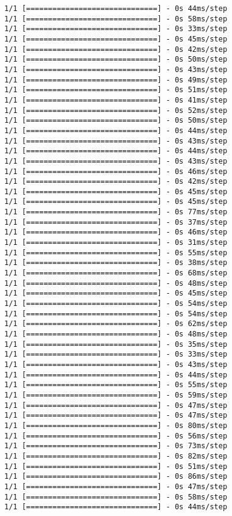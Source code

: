 \documentclass[11pt]{article}
\begin{document}
\begin{Verbatim}[commandchars=\\\{\}]
1/1 [==============================] - 0s 44ms/step
1/1 [==============================] - 0s 58ms/step
1/1 [==============================] - 0s 33ms/step
1/1 [==============================] - 0s 45ms/step
1/1 [==============================] - 0s 42ms/step
1/1 [==============================] - 0s 50ms/step
1/1 [==============================] - 0s 43ms/step
1/1 [==============================] - 0s 49ms/step
1/1 [==============================] - 0s 51ms/step
1/1 [==============================] - 0s 41ms/step
1/1 [==============================] - 0s 52ms/step
1/1 [==============================] - 0s 50ms/step
1/1 [==============================] - 0s 44ms/step
1/1 [==============================] - 0s 43ms/step
1/1 [==============================] - 0s 44ms/step
1/1 [==============================] - 0s 43ms/step
1/1 [==============================] - 0s 46ms/step
1/1 [==============================] - 0s 42ms/step
1/1 [==============================] - 0s 45ms/step
1/1 [==============================] - 0s 45ms/step
1/1 [==============================] - 0s 77ms/step
1/1 [==============================] - 0s 37ms/step
1/1 [==============================] - 0s 46ms/step
1/1 [==============================] - 0s 31ms/step
1/1 [==============================] - 0s 55ms/step
1/1 [==============================] - 0s 38ms/step
1/1 [==============================] - 0s 68ms/step
1/1 [==============================] - 0s 48ms/step
1/1 [==============================] - 0s 45ms/step
1/1 [==============================] - 0s 54ms/step
1/1 [==============================] - 0s 54ms/step
1/1 [==============================] - 0s 62ms/step
1/1 [==============================] - 0s 48ms/step
1/1 [==============================] - 0s 35ms/step
1/1 [==============================] - 0s 33ms/step
1/1 [==============================] - 0s 43ms/step
1/1 [==============================] - 0s 44ms/step
1/1 [==============================] - 0s 55ms/step
1/1 [==============================] - 0s 59ms/step
1/1 [==============================] - 0s 47ms/step
1/1 [==============================] - 0s 47ms/step
1/1 [==============================] - 0s 80ms/step
1/1 [==============================] - 0s 56ms/step
1/1 [==============================] - 0s 73ms/step
1/1 [==============================] - 0s 82ms/step
1/1 [==============================] - 0s 51ms/step
1/1 [==============================] - 0s 86ms/step
1/1 [==============================] - 0s 47ms/step
1/1 [==============================] - 0s 58ms/step
1/1 [==============================] - 0s 44ms/step

\end{Verbatim}
\end{document}

